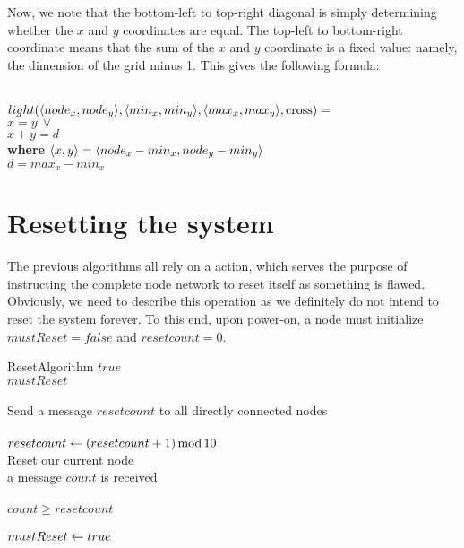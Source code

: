 Now, we note that the bottom-left to top-right diagonal is simply determining whether the $x$ and $y$ coordinates are equal. The top-left to bottom-right coordinate means that the sum of the $x$ and $y$ coordinate is a fixed value: namely, the dimension of the grid minus 1. This gives the following formula:

\begin{tabbing}
\hspace{2cm} \= \\
$light(\langle node_x,node_y \rangle, \langle min_x,min_y \rangle, \langle max_x,max_y \rangle, \mbox{cross}) =$ \\
\> $x = y~\lor$ \\
\> $x + y = d$ \\
\textbf{where} \> $\langle x,y \rangle = \langle node_x - min_x, node_y - min_y \rangle$ \\
               \> $d = max_x - min_x$ \\
\end{tabbing}

\section{Resetting the system}
\label{sec:reset}

The previous algorithms all rely on a  action, which serves the purpose of instructing the complete node network to reset itself as something is flawed. Obviously, we need to describe this operation as we definitely do not intend to reset the system forever. To this end, upon power-on, a node must initialize $mustReset = false$ and $resetcount = 0$.

\begin{myalgo}{ResetAlgorithm}{}
\qwhile $true$ \\
  \qif $mustReset$ \\
  \qthen {} \\
         Send a message $resetcount$ to all directly connected nodes \\
          \\
         $resetcount \mathrel{\leftarrow} (resetcount + 1) \operatorname{mod} 10$ \\
         \label{reset:doit} Reset our current node \qfi \\
  \label{reset:recv} \qif a message $count$ is received \\
  \qthen {} \\
         \qif $count \geq resetcount$ \\
         \qthen {} \\
                $mustReset \mathrel{\leftarrow} true$ \\
         \qelse {} \\
                \qignore \qfi \qfi \qelihw
\end{myalgo}

